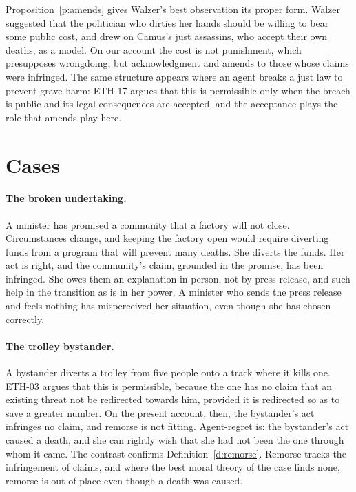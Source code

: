 \documentclass{situationist-preprint}
\begin{document}
Proposition~\ref{p:amends} gives Walzer's best observation its proper form. Walzer suggested that the politician who dirties her hands should be willing to bear some public cost, and drew on Camus's just assassins, who accept their own deaths, as a model. On our account the cost is not punishment, which presupposes wrongdoing, but acknowledgment and amends to those whose claims were infringed. The same structure appears where an agent breaks a just law to prevent grave harm: ETH-17 argues that this is permissible only when the breach is public and its legal consequences are accepted, and the acceptance plays the role that amends play here.

\section{Cases}

\paragraph{The broken undertaking.} A minister has promised a community that a factory will not close. Circumstances change, and keeping the factory open would require diverting funds from a program that will prevent many deaths. She diverts the funds. Her act is right, and the community's claim, grounded in the promise, has been infringed. She owes them an explanation in person, not by press release, and such help in the transition as is in her power. A minister who sends the press release and feels nothing has misperceived her situation, even though she has chosen correctly.

\paragraph{The trolley bystander.} A bystander diverts a trolley from five people onto a track where it kills one. ETH-03 argues that this is permissible, because the one has no claim that an existing threat not be redirected towards him, provided it is redirected so as to save a greater number. On the present account, then, the bystander's act infringes no claim, and remorse is not fitting. Agent-regret is: the bystander's act caused a death, and she can rightly wish that she had not been the one through whom it came. The contrast confirms Definition~\ref{d:remorse}. Remorse tracks the infringement of claims, and where the best moral theory of the case finds none, remorse is out of place even though a death was caused.
\end{document}
